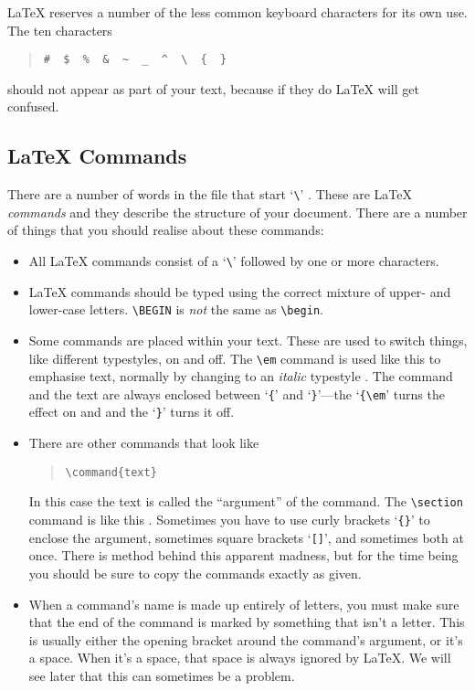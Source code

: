 \LaTeX{} reserves a number of the less common keyboard characters for its
own use. The ten characters
\begin{quote}\begin{verbatim}
#  $  %  &  ~  _  ^  \  {  }
\end{verbatim}\end{quote}
should not appear as part of your text, because if they do
\LaTeX{} will get confused.

\subsection{\LaTeX{} Commands}

There are a number of words in the file that start `\verb|\|' .  These are \LaTeX{} {\em commands\/} and they describe the structure
of your document.
There are a number of things that you should realise about these commands:
\begin{itemize}

\item All \LaTeX{} commands consist of a `\verb|\|' followed by one or more
characters.

\item \LaTeX{} commands should be typed using the correct mixture of upper- and
lower-case letters.  \verb|\BEGIN| is {\em not\/} the same as \verb|\begin|.

\item Some commands are placed within your text.  These are used to
switch things, like different typestyles, on and off. The \verb|\em| command
is used like this to emphasise text, normally by changing to an {\it italic\/}
typestyle .  The command and the text are always enclosed between
`\verb|{|' and `\verb|}|'---the `\verb|{\em|' turns the effect on and and the
`\verb|}|' turns it off.

\item There are other commands that look like
\begin{quote}\begin{verbatim}
\command{text}
\end{verbatim}\end{quote}
In this case the text is called the ``argument'' of the command.  The
\verb|\section| command is like this .
Sometimes you have to use curly brackets `\verb|{}|' to enclose the argument,
sometimes square brackets `\verb|[]|', and sometimes both at once.
There is method behind this apparent madness, but for the
time being you should be sure to copy the commands exactly as given.

\item When a command's name is made up entirely of letters, you must make sure
that the end of the command is marked by something that isn't a letter.
This is usually either the opening bracket around the command's argument, or
it's a space.  When it's a space, that space is always ignored by \LaTeX. We
will see later that this can sometimes be a problem.

\end{itemize}

